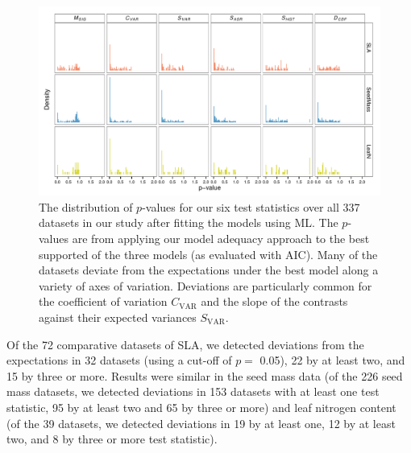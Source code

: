 \begin{figure}[p]
  \centering
  \includegraphics[angle=90, origin=c, scale=0.85]{figs/pval-hist-ml}
  \caption[Distribution of $p$-values for test statistics (ML)]{The distribution of $p$-values for our six test statistics over all 337 datasets in our study after fitting the models using ML. The $p$-values are from applying our model adequacy approach to the best supported of the three models (as evaluated with AIC). Many of the datasets deviate from the expectations under the best model along a variety of axes of variation. Deviations are particularly common for the coefficient of variation $C_{\text{VAR}}$ and the slope of the contrasts against their expected variances $S_{\text{VAR}}$.}
  \label{fig:pvalues}
\end{figure}

Of the 72 comparative datasets of SLA, we detected deviations from the expectations in 32 datasets (using a cut-off of $p=$ 0.05), 22 by at least two, and 15 by three or more. 
Results were similar in the seed mass data (of the 226 seed mass datasets, we detected deviations in 153 datasets with at least one test statistic, 95 by at least two and 65 by three or more) and leaf nitrogen content 
(of the 39 datasets, we detected deviations in 19 by at least one, 12 by at least two, and 8 by three or more test statistic). 

